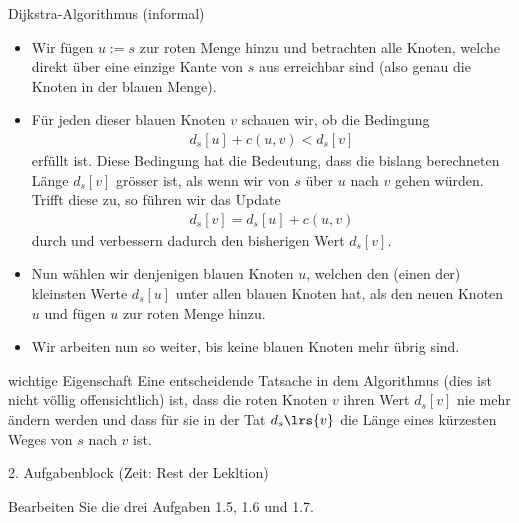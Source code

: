 \begin{frame}[fragile]{Dijkstra-Algorithmus (informal)}
\begin{itemize}
    \item Wir fügen $u:=s$ zur roten Menge hinzu und betrachten alle Knoten, welche direkt über eine einzige Kante von $s$ aus erreichbar sind (also genau die Knoten in der blauen Menge).
    \item Für jeden dieser blauen Knoten $v$ schauen wir, ob die Bedingung
    \begin{align*}
        d_s[u] + c(u,v) < d_s[v]
    \end{align*}
    erfüllt ist. Diese Bedingung hat die Bedeutung, dass die bislang berechneten Länge $d_s[v]$ grösser ist, als wenn wir von $s$ über $u$ nach $v$ gehen würden. Trifft diese zu, so führen wir das Update
    \begin{align*}
        d_s[v] = d_s[u] + c(u,v)
    \end{align*}
    durch und verbessern dadurch den bisherigen Wert $d_s[v]$.
\end{itemize}
\end{frame}

\begin{frame}[fragile]{}
\begin{itemize}
    \item Nun wählen wir denjenigen blauen Knoten $u$, welchen den (einen der) kleinsten Werte $d_s[u]$ unter allen blauen Knoten hat, als den neuen Knoten $u$ und fügen $u$ zur roten Menge hinzu.
    \item Wir arbeiten nun so weiter, bis keine blauen Knoten mehr übrig sind.
\end{itemize}
\end{frame}

\begin{frame}[fragile]{wichtige Eigenschaft}
Eine entscheidende Tatsache in dem Algorithmus (dies ist nicht völlig offensichtlich) ist, dass die roten Knoten $v$ ihren Wert $d_s[v]$ nie mehr ändern werden und dass für sie in der Tat  $d_s\lrs{v}$ die Länge eines kürzesten Weges von $s$ nach $v$ ist.
\end{frame}


\begin{frame}[fragile]{2. Aufgabenblock (Zeit: Rest der Lekltion)}
\begin{center}
    Bearbeiten Sie die drei Aufgaben 1.5, 1.6 und 1.7.
\end{center}
\end{frame}

